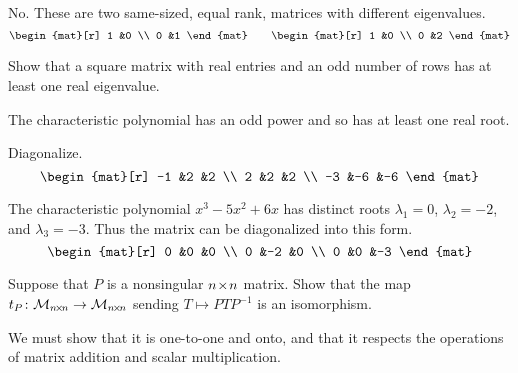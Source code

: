 \begin{exercises}
    \begin{answer}
      No.
      These are two same-sized, equal rank, matrices
      with different eigenvalues.
      \begin{equation*}
        \begin{mat}[r]
          1  &0  \\
          0  &1
        \end{mat}
        \qquad
        \begin{mat}[r]
          1  &0  \\
          0  &2
        \end{mat}
      \end{equation*}
    \end{answer}
  \item 
    Show that a square matrix with real entries and an odd number of rows
    has at least one real eigenvalue.
    \begin{answer}
      The characteristic polynomial has an odd power and so 
      has at least one real root.  
    \end{answer}
  \item 
    Diagonalize.
    \begin{equation*}
       \begin{mat}[r]
         -1  &2  &2  \\
          2  &2  &2  \\
         -3  &-6 &-6
       \end{mat}
    \end{equation*}
    \begin{answer}
      The characteristic polynomial $x^3-5x^2+6x$ has distinct roots
      \( \lambda_1=0 \), \( \lambda_2=-2 \), and \( \lambda_3=-3 \).
      Thus the matrix can be diagonalized into this form.
      \begin{equation*}
         \begin{mat}[r]
            0  &0  &0  \\
            0  &-2 &0  \\
            0  &0  &-3
         \end{mat}
      \end{equation*}    
    \end{answer}
  \item 
    Suppose that \( P \) is a nonsingular \( n \! \times \! n \) matrix.
    Show that 
    the 
    map \( \mbox{$t_P\colon \mathcal{M}_{n \! \times \! n}\to \mathcal{M}_{n \! \times \! n}$} \)
    sending \( T\mapsto PTP^{-1} \)
    is an isomorphism.
    \begin{answer}
      We must show that it is one-to-one and onto, and that it respects the
      operations of matrix addition and scalar multiplication.


\end{answer}
\end{exercises}
